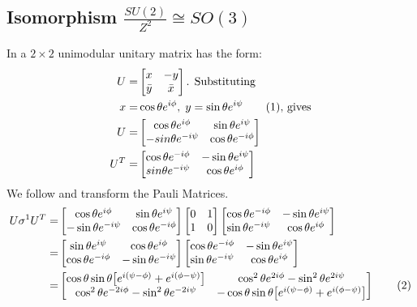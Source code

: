 \documentclass[]{article}
\newcommand\numberthis{\addtocounter{equation}{1}\tag{\theequation}}
\begin{document}
\subsection{Isomorphism $\frac{SU(2)}{Z^2} \cong SO(3)$}


In \cite[Section 3]{westra2008SU2} a $2\times 2$ unimodular unitary matrix has the form:
\begin{align*}
	U =& \begin{bmatrix}
		x&-y\\
		\bar{y}&\bar{x}
	\end{bmatrix} \text{. Substituting}\\
	x =& \cos{\theta} e^{i\phi}, \; y = \sin{\theta} e^{i\psi} \numberthis \label{eq:xy} \text{, gives} \\
	U=& \begin{bmatrix}
		\cos{\theta} e^{i\phi}&\sin{\theta}e^{i\psi}\\
		-sin{\theta}e^{-i\psi}&\cos{\theta} e^{-i\phi}
	\end{bmatrix}\\
	U^T =& \begin{bmatrix}
		\cos{\theta} e^{-i\phi}&-\sin{\theta}e^{i\psi}\\
		sin{\theta}e^{-i\psi}&\cos{\theta} e^{i\phi}
	\end{bmatrix}
\end{align*}
We follow \cite[Section 4]{westra2008SU2} and transform the Pauli Matrices.
\begin{align*}
	U \sigma^1 U^T  =&  \begin{bmatrix}
		\cos{\theta} e^{i\phi}&\sin{\theta}e^{i\psi}\\
		-\sin{\theta}e^{-i\psi}&\cos{\theta} e^{-i\phi}
	\end{bmatrix} \begin{bmatrix}
		0&1\\
		1&0
	\end{bmatrix} \begin{bmatrix}
		\cos{\theta} e^{-i\phi}&-\sin{\theta}e^{i\psi}\\
		\sin{\theta}e^{-i\psi}&\cos{\theta} e^{i\phi}
	\end{bmatrix}\\
	=&  \begin{bmatrix}
		\sin{\theta}e^{i\psi} & \cos{\theta} e^{i\phi}\\
		\cos{\theta} e^{-i\phi}&-\sin{\theta}e^{-i\psi}
	\end{bmatrix} \begin{bmatrix}
		\cos{\theta} e^{-i\phi}&-\sin{\theta}e^{i\psi}\\
		\sin{\theta}e^{-i\psi}&\cos{\theta} e^{i\phi}
	\end{bmatrix}\\
	=& \begin{bmatrix}
		\cos\theta \sin\theta\big[e^{i(\psi-\phi)}+e^{i(\phi-\psi)}\big]&\cos^2\theta e^{2i\phi}-\sin^2\theta e^{2i\psi} \\
		\cos^2\theta e^{-2i\phi}-\sin^2\theta e^{-2i\psi}&-\cos\theta \sin\theta\big[e^{i(\psi-\phi)}+e^{i(\phi-\psi)}\big]
	\end{bmatrix} \numberthis \label{eq:U:sigma1:UT}
\end{align*}
\end{document}
